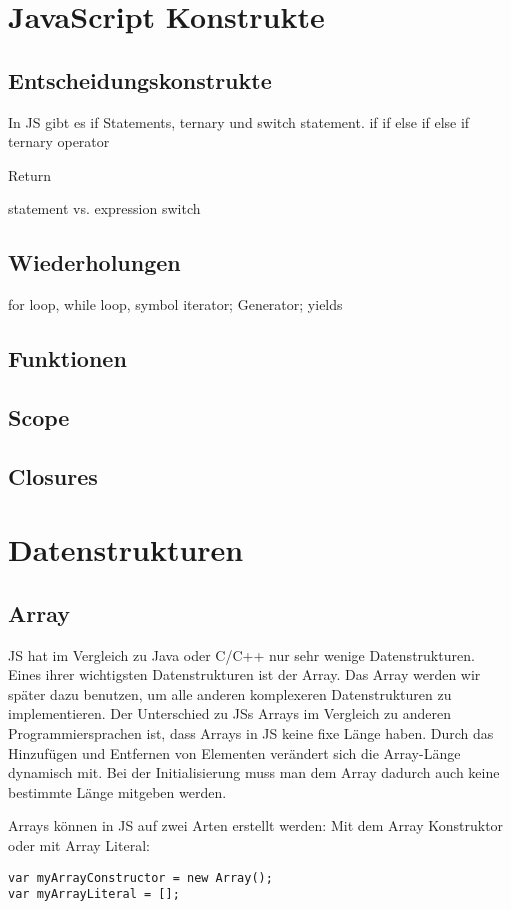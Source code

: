 \documentclass{book}
\begin{document}
\chapter{JavaScript Konstrukte}
\section{Entscheidungskonstrukte}
In JS gibt es if Statements, ternary und switch statement.
if
if else
if else if 
ternary operator

Return 

statement vs. expression
switch

\section{Wiederholungen}
for loop, while loop, symbol iterator; Generator; yields

\section{Funktionen}
\section{Scope}
\section{Closures}

\chapter{Datenstrukturen}
\section{Array}
JS hat im Vergleich zu Java oder C/C++ nur sehr wenige Datenstrukturen. Eines ihrer wichtigsten Datenstrukturen ist der Array. Das Array werden wir später dazu benutzen, um alle anderen komplexeren Datenstrukturen zu implementieren. Der Unterschied zu JSs Arrays im Vergleich zu anderen Programmiersprachen ist, dass Arrays in JS keine fixe Länge haben. Durch das Hinzufügen und Entfernen von Elementen verändert sich die Array-Länge dynamisch mit. Bei der Initialisierung muss man dem Array dadurch auch keine bestimmte Länge mitgeben werden.

Arrays können in JS auf zwei Arten erstellt werden: Mit dem Array Konstruktor oder mit Array Literal:
\begin{lstlisting}[caption=Array Konstruktor]
var myArrayConstructor = new Array();
var myArrayLiteral = [];
\end{lstlisting}
\end{document}
